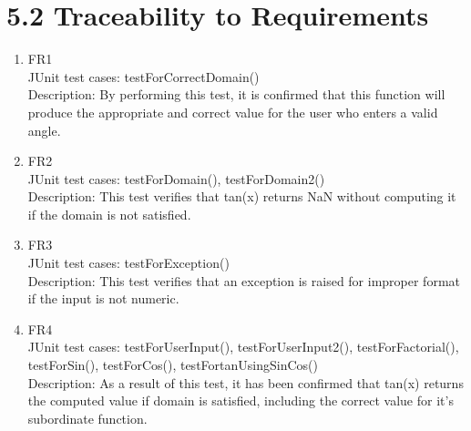 \documentclass[12pt]{article}
\begin{document}
\section*{5.2 Traceability to Requirements}
\begin{enumerate}
        \item FR1\\
        JUnit test cases: testForCorrectDomain()\\
        Description: By performing this test, it is confirmed that this function will produce the appropriate and correct value for the user who enters a valid angle.
        
        \item FR2\\
        JUnit test cases: testForDomain(), testForDomain2()\\
        Description: This test verifies that tan(x) returns NaN without computing it if the domain is not satisfied.
        
        \item FR3\\
        JUnit test cases: testForException()\\
        Description: This test verifies that an exception is raised for improper format if the input is not numeric.
        
        \item FR4\\
        JUnit test cases: testForUserInput(), testForUserInput2(),  testForFactorial(), testForSin(), testForCos(), testFortanUsingSinCos()\\
        Description: As a result of this test, it has been confirmed that tan(x) returns the computed value if domain is satisfied, including the correct value for it's subordinate function.

    \end{enumerate}
\end{document}
